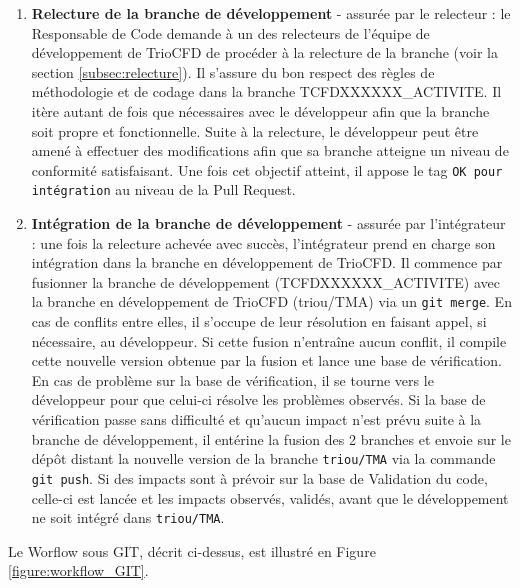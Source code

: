 \begin{enumerate}
   \item \textbf{Relecture de la branche de développement} - assurée par le relecteur : le Responsable de Code demande à un des relecteurs de l'équipe de développement de TrioCFD de procéder à la relecture de la branche (voir la section \ref{subsec:relecture}). Il s'assure du bon respect des règles de méthodologie et de codage dans la branche TCFDXXXXXX\_ACTIVITE. Il itère autant de fois que nécessaires avec le développeur afin que la branche soit propre et fonctionnelle. Suite à la relecture, le développeur peut être amené à effectuer des modifications afin que sa branche atteigne un niveau de conformité satisfaisant. Une fois cet objectif atteint, il appose le tag \texttt{OK pour intégration} au niveau de la Pull Request.
   \item \textbf{Intégration de la branche de développement} - assurée par l'intégrateur : une fois la relecture achevée avec succès, l'intégrateur prend en charge son intégration dans la branche en développement de TrioCFD. Il commence par fusionner la branche de développement (TCFDXXXXXX\_ACTIVITE) avec la branche en développement de TrioCFD (triou/TMA) via un \texttt{git merge}. En cas de conflits entre elles, il s'occupe de leur résolution en faisant appel, si nécessaire, au développeur. Si cette fusion n'entraîne aucun conflit, il compile cette nouvelle version obtenue par la fusion et lance une base de vérification. En cas de problème sur la base de vérification, il se tourne vers le développeur pour que celui-ci résolve les problèmes observés. Si la base de vérification passe sans difficulté et qu'aucun impact n'est prévu suite à la branche de développement, il entérine la fusion des 2 branches et envoie sur le dépôt distant la nouvelle version de la branche \texttt{triou/TMA} via la commande \texttt{git push}. Si des impacts sont à prévoir sur la base de Validation du code, celle-ci est lancée et les impacts observés, validés, avant que le développement ne soit intégré dans \texttt{triou/TMA}.
\end{enumerate} 
Le Worflow sous GIT, décrit ci-dessus, est illustré en Figure \ref{figure:workflow_GIT}.
